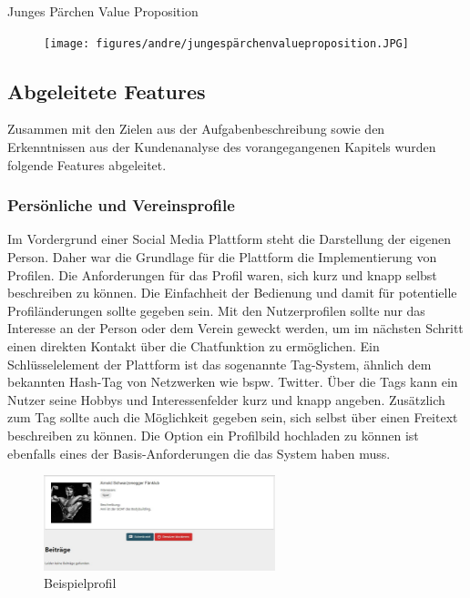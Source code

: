 \begin{table}[H]
    \centering
    \caption{Junges Pärchen Value Proposition}
\end{table}

\begin{figure}[H]
    \centering
    \texttt{[image: figures/andre/jungespärchenvalueproposition.JPG]}
    \label{fig:jungespärchenvalueproposition}
\end{figure}

\subsection{Abgeleitete Features}
Zusammen mit den Zielen aus der Aufgabenbeschreibung sowie den Erkenntnissen aus der Kundenanalyse des vorangegangenen Kapitels wurden folgende Features abgeleitet.

\subsubsection{Persönliche und Vereinsprofile}
\label{sec:abgeleitetefeatures}
Im Vordergrund einer Social Media Plattform steht die Darstellung der eigenen Person. Daher war die Grundlage für die Plattform die Implementierung von Profilen.
Die Anforderungen für das Profil waren, sich kurz und knapp selbst beschreiben zu können. Die Einfachheit der Bedienung und damit für potentielle Profiländerungen sollte gegeben sein. Mit den Nutzerprofilen sollte nur das Interesse an der Person oder dem Verein geweckt werden, um im nächsten Schritt einen direkten Kontakt über die Chatfunktion zu ermöglichen.
Ein Schlüsselelement der Plattform ist das sogenannte Tag-System, ähnlich dem bekannten Hash-Tag von Netzwerken wie bspw. Twitter. Über die Tags kann ein Nutzer seine Hobbys und Interessenfelder kurz und knapp angeben.
Zusätzlich zum Tag sollte auch die Möglichkeit gegeben sein, sich selbst über einen Freitext beschreiben zu können.
Die Option ein Profilbild hochladen zu können ist ebenfalls eines der Basis-Anforderungen die das System haben muss.

\begin{figure}[ht!]
    \centering
    \includegraphics[width=0.6\textwidth]{figures/andre/beispielprofil.jpg}
    \caption{Beispielprofil}
    \label{fig:beispielprofil}
\end{figure}

